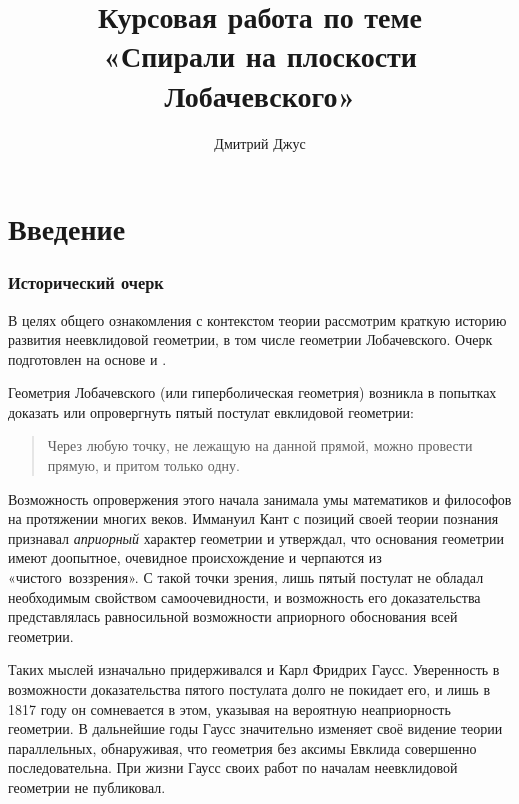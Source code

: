\documentclass{article}
\numberwithin{equation}{section}
\begin{document}
\author{Дмитрий Джус}
\title{Курсовая работа по теме \\
  «Спирали на плоскости Лобачевского»}
\maketitle
\thispagestyle{empty}

\clearpage
\tableofcontents
\listoffigures

\clearpage

\part{Введение}

\section{Исторический очерк}
\label{sec:intro}

В целях общего ознакомления с контекстом теории рассмотрим краткую
историю развития неевклидовой геометрии, в том числе геометрии
Лобачевского. Очерк подготовлен на основе \cite{milnor82} и
\cite{norden56}.

Геометрия Лобачевского (или гиперболическая геометрия) возникла в
попытках доказать или опровергнуть пятый постулат евклидовой
геометрии:

\begin{quote}
  Через любую точку, не лежащую на данной прямой, можно провести
  прямую, и притом только одну.
\end{quote}

Возможность опровержения этого начала занимала умы математиков и
философов на протяжении многих веков. Иммануил Кант с позиций своей
теории познания признавал \emph{априорный} характер геометрии и
утверждал, что основания геометрии имеют доопытное, очевидное
происхождение и черпаются из «чистого воззрения». С такой точки
зрения, лишь пятый постулат не обладал необходимым свойством
самоочевидности, и возможность его доказательства представлялась
равносильной возможности априорного обоснования всей геометрии.

Таких мыслей изначально придерживался и Карл Фридрих Гаусс.
Уверенность в возможности доказательства пятого постулата долго не
покидает его, и лишь в 1817 году он сомневается в этом, указывая на
вероятную неаприорность геометрии. В дальнейшие годы Гаусс значительно
изменяет своё видение теории параллельных, обнаруживая, что геометрия
без аксимы Евклида совершенно последовательна. При жизни Гаусс своих
работ по началам неевклидовой геометрии не публиковал.
\end{document}
